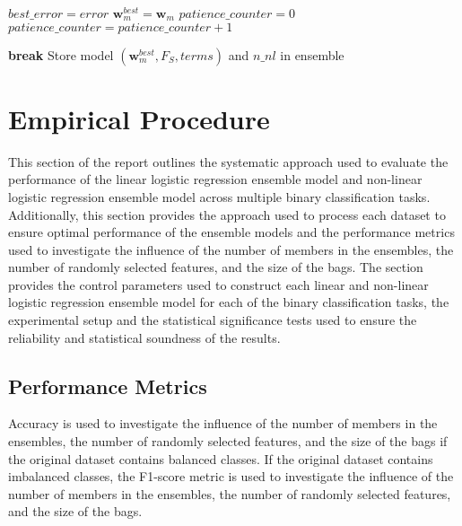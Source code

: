 \documentclass[10pt, conference]{IEEEtran}
\begin{document}
\begin{algorithm}[H]
\begin{algorithmic}[1]
                    \State $best\_error = error$
                    \State $\textbf{w}_m^{best} = \textbf{w}_m$
                    \State $patience\_counter = 0$
                \Else
                    \State $patience\_counter = patience\_counter + 1$
                \EndIf
                
                    \State \textbf{break}
                \EndIf
            \EndFor
            \State Store model $(\textbf{w}_m^{best}, F_S, terms)$ and $n\_nl$ in ensemble
        \EndFor
    \end{algorithmic}
\end{algorithm}

\section{Empirical Procedure} \label{section: Empeirical Procedure}

This section of the report outlines the systematic approach used to evaluate the performance of the 
linear logistic regression ensemble model and non-linear logistic regression ensemble model
across multiple binary classification tasks. Additionally, this section provides the approach
used to process each dataset to ensure optimal performance of the ensemble models and the performance
metrics used to investigate the influence of the number of members in the
ensembles, the number of randomly selected features, and the size of the bags.
The section provides the control parameters used to construct each
linear and non-linear logistic regression ensemble model for each of the binary classification tasks,
the experimental setup and the statistical significance tests used to ensure the reliability and statistical
soundness of the results.

\subsection{Performance Metrics}

Accuracy is used to investigate the influence of the number of members in the
ensembles, the number of randomly selected features, and the size of the bags if the
original dataset contains balanced classes. If the original dataset contains imbalanced
classes, the F1-score metric is used to investigate the influence of the number of members in the
ensembles, the number of randomly selected features, and the size of the bags.
\end{document}
